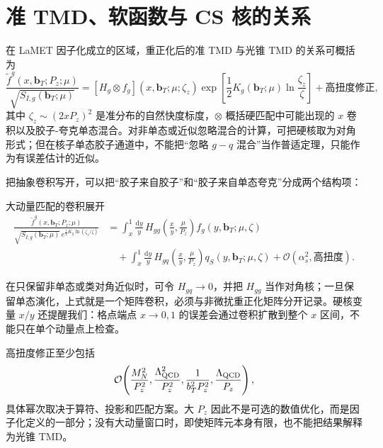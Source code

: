 \documentclass[UTF8,12pt,a4paper,twoside,openany]{ctexbook}
\newcommand{\dd}{\mathrm{d}}
\newcommand{\bT}{\boldsymbol b_T}
\begin{document}
\section{准 TMD、软函数与 CS 核的关系}

在 LaMET 因子化成立的区域，重正化后的准 TMD 与光锥 TMD 的关系可概括为
\begin{equation}
  \frac{\widetilde f^{g}(x,\bT;P_z;\mu)}
  {\sqrt{S_{I,g}(\bT;\mu)}}
  =
  \left[H_g\otimes f_g\right](x,\bT;\mu;\zeta_z)
  \exp\left[\frac{1}{2}K_g(\bT;\mu)
  \ln\frac{\zeta_z}{\zeta}\right]
  +\text{高扭度修正},
  \label{eq:lametgluon}
\end{equation}
其中 \(\zeta_z\sim(2xP_z)^2\) 是准分布的自然快度标度，\(\otimes\) 概括硬匹配中可能出现的 \(x\) 卷积以及胶子-夸克单态混合。对非单态或近似忽略混合的计算，可把硬核取为对角形式；但在核子单态胶子通道中，不能把“忽略 \(g-q\) 混合”当作普适定理，只能作为有误差估计的近似\cite{ZhangGluonLaMET2019,JiReview2021}。

把抽象卷积写开，可以把“胶子来自胶子”和“胶子来自单态夸克”分成两个结构项：
\begin{keyformula}{大动量匹配的卷积展开}
\begin{align}
  \frac{\widetilde f^{g}(x,\bT;P_z;\mu)}
  {\sqrt{S_{I,g}(\bT;\mu)}\,e^{\frac12K_g\ln(\zeta_z/\zeta)}}
  &=\int_x^1\frac{\dd y}{y}\,
  H_{gg}\!\left(\frac{x}{y},\frac{\mu}{P_z}\right)
  f_g(y,\bT;\mu,\zeta)
  \nonumber\\
  &\quad+\int_x^1\frac{\dd y}{y}\,
  H_{gq}\!\left(\frac{x}{y},\frac{\mu}{P_z}\right)
  q_S(y,\bT;\mu,\zeta)
  +\mathcal O(\alpha_s^2,\text{高扭度}).
  \label{eq:lametconvolution}
\end{align}
\end{keyformula}

在只保留非单态或类对角近似时，可令 \(H_{gq}\to0\)，并把 \(H_{gg}\) 当作对角核；一旦保留单态演化，上式就是一个矩阵卷积，必须与非微扰重正化矩阵分开记录。硬核变量 \(x/y\) 还提醒我们：格点端点 \(x\to0,1\) 的误差会通过卷积扩散到整个 \(x\) 区间，不能只在单个动量点上检查。

高扭度修正至少包括
\begin{equation}
  \mathcal O\!\left(\frac{M_N^2}{P_z^2},
  \frac{\Lambda_{\rm QCD}^2}{P_z^2},
  \frac{1}{b_T^2P_z^2},
  \frac{\Lambda_{\rm QCD}}{P_z}\right),
  \label{eq:powercorrections}
\end{equation}
具体幂次取决于算符、投影和匹配方案。大 \(P_z\) 因此不是可选的数值优化，而是因子化定义的一部分；没有大动量窗口时，即使矩阵元本身有限，也不能把结果解释为光锥 TMD。
\end{document}
